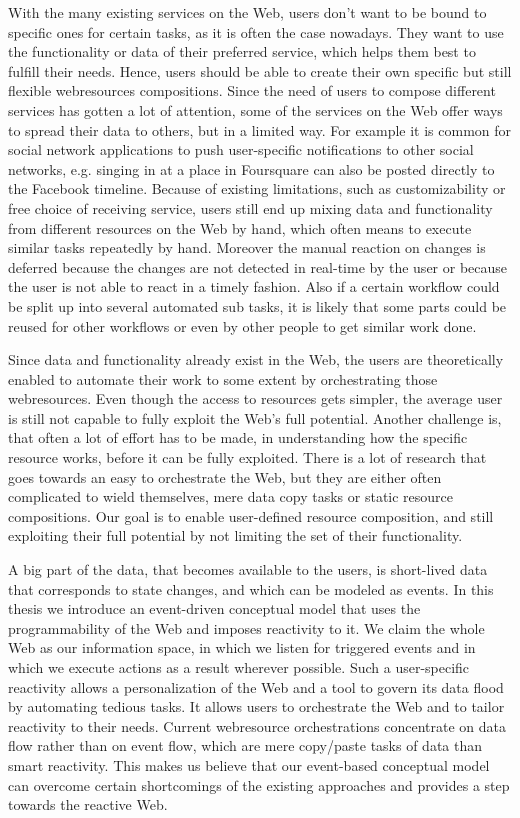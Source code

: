 With the many existing services on the Web, users don't want to be bound to specific ones for certain tasks, as it is often the case nowadays.
They want to use the functionality or data of their preferred service, which helps them best to fulfill their needs.
Hence, users should be able to create their own specific but still flexible \textrm{\glspl{webresource}} compositions.
Since the need of users to compose different services has gotten a lot of attention, some of the services on the Web offer ways to spread their data to others, but in a limited way.
For example it is common for social network applications to push user-specific notifications to other social networks, e.g. singing in at a place in \textrm{Foursquare} can also be posted directly to the \textrm{Facebook} timeline.
Because of existing limitations, such as customizability or free choice of receiving service, users still end up mixing data and functionality from different resources on the Web by hand, which often means to execute similar tasks repeatedly by hand.
Moreover the manual reaction on changes is deferred because the changes are not detected in real-time by the user or because the user is not able to react in a timely fashion.
Also if a certain workflow could be split up into several automated sub tasks, it is likely that some parts could be reused for other workflows or even by other people to get similar work done.

Since data and functionality already exist in the Web, the users are theoretically enabled to automate their work to some extent by orchestrating those \textrm{\glspl{webresource}}.
Even though the access to resources gets simpler, the average user is still not capable to fully exploit the Web's full potential.
Another challenge is, that often a lot of effort has to be made, in understanding how the specific resource works, before it can be fully exploited.
There is a lot of research that goes towards an easy to orchestrate the Web, but they are either often complicated to wield themselves, mere data copy tasks or static resource compositions.
Our goal is to enable user-defined resource composition, and still exploiting their full potential by not limiting the set of their functionality.

A big part of the data, that becomes available to the users, is short-lived data that corresponds to state changes, and which can be modeled as events.
In this thesis we introduce an event-driven conceptual model that uses the programmability of the Web and imposes reactivity to it.
We claim the whole Web as our information space, in which we listen for triggered events and in which we execute actions as a result wherever possible.
Such a user-specific reactivity allows a personalization of the Web and a tool to govern its data flood by automating tedious tasks.
It allows users to orchestrate the Web and to tailor reactivity to their needs.
Current \textrm{\gls{webresource}} orchestrations concentrate on data flow rather than on event flow, which are mere copy/paste tasks of data than smart reactivity.
This makes us believe that our event-based conceptual model can overcome certain shortcomings of the existing approaches and provides a step towards the reactive Web.


